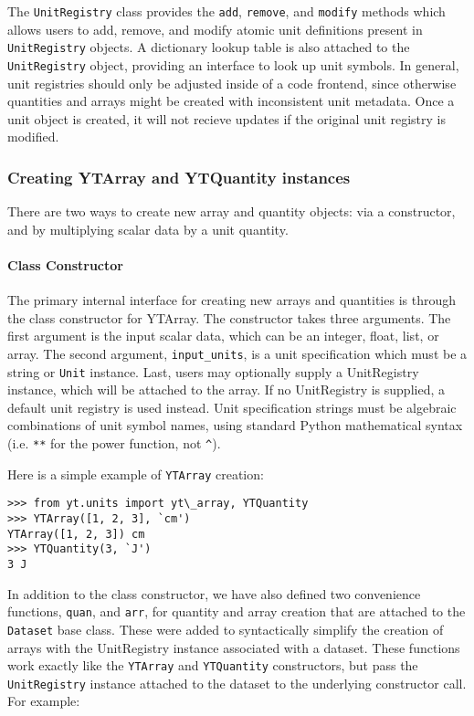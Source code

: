 The \texttt{UnitRegistry} class provides the \texttt{add},
\texttt{remove}, and \texttt{modify} methods which allows users to add,
remove, and modify atomic unit definitions present in
\texttt{UnitRegistry} objects. A dictionary lookup table is also
attached to the \texttt{UnitRegistry} object, providing an interface to
look up unit symbols. In general, unit registries should only be
adjusted inside of a code frontend, since otherwise quantities and
arrays might be created with inconsistent unit metadata. Once a unit
object is created, it will not recieve updates if the original unit
registry is modified.

\subsubsection{Creating YTArray and YTQuantity
instances}\label{creating-ytarray-and-ytquantity-instances}

There are two ways to create new array and quantity objects: via a constructor,
and by multiplying scalar data by a unit quantity.

\paragraph{Class Constructor}\label{class-constructor}

The primary internal interface for creating new arrays and quantities is through
the class constructor for YTArray. The constructor takes three arguments. The
first argument is the input scalar data, which can be an integer, float, list,
or array. The second argument, \texttt{input\_units}, is a unit specification
which must be a string or \texttt{Unit} instance. Last, users may optionally
supply a UnitRegistry instance, which will be attached to the array. If no
UnitRegistry is supplied, a default unit registry is used instead. Unit
specification strings must be algebraic combinations of unit symbol names, using
standard Python mathematical syntax (i.e. \texttt{**} for the power function,
not \texttt{\^{}}).

Here is a simple example of \texttt{YTArray} creation:

\begin{Verbatim}
>>> from yt.units import yt\_array, YTQuantity 
>>> YTArray([1, 2, 3], `cm') 
YTArray([1, 2, 3]) cm
>>> YTQuantity(3, `J') 
3 J
\end{Verbatim}

In addition to the class constructor, we have also defined two
convenience functions, \texttt{quan}, and \texttt{arr}, for quantity and
array creation that are attached to the \texttt{Dataset} base
class. These were added to syntactically simplify the creation of arrays
with the UnitRegistry instance associated with a dataset. These
functions work exactly like the \texttt{YTArray} and \texttt{YTQuantity}
constructors, but pass the \texttt{UnitRegistry} instance attached to
the dataset to the underlying constructor call. For example:

